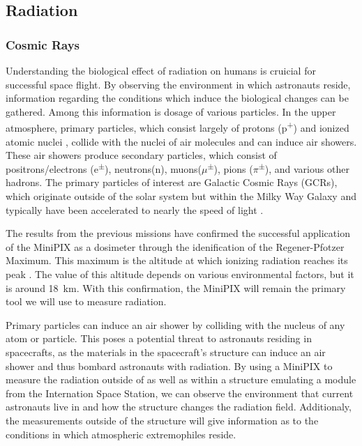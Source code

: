 \subsection{Radiation}
\label{subsec:RadiationBackground}


\subsubsection{Cosmic Rays}
Understanding the biological effect of radiation on humans is cruicial for successful space flight.
By observing the environment in which astronauts reside, information regarding the conditions which induce the biological changes can be gathered.
Among this information is dosage of various particles.
In the upper atmosphere, primary particles, which consist largely of protons (p\textsuperscript{+}) and ionized atomic nuclei \cite{Frank}, collide with the nuclei of air molecules and can induce air showers.
These air showers produce secondary particles, which consist of positrons/electrons (e\textsuperscript{$\pm$}), neutrons(n), muons($\mu$\textsuperscript{$\pm$}), pions ($\pi$\textsuperscript{$\pm$}), and various other hadrons.
The primary particles of interest are Galactic Cosmic Rays (GCRs), which originate outside of the solar system but within the Milky Way Galaxy and typically have been accelerated to nearly the speed of light \cite{GCRs}.

The results from the previous missions have confirmed the successful application of the MiniPIX as a dosimeter through the idenification of the Regener-Pfotzer Maximum. This maximum is the altitude at which ionizing radiation reaches its peak \cite{Regener}. The value of this altitude depends on various environmental factors, but it is around \SI{18}{\kilo\meter}. With this confirmation, the MiniPIX will remain the primary tool we will use to measure radiation.

Primary particles can induce an air shower by colliding with the nucleus of any atom or particle.
This poses a potential threat to astronauts residing in spacecrafts, as the materials in the spacecraft's structure can induce an air shower and thus bombard astronauts with radiation.
By using a MiniPIX to measure the radiation outside of as well as within a structure emulating a module from the Internation Space Station, we can observe the environment that current astronauts live in and how the structure changes the radiation field.
Additionaly, the measurements outside of the structure will give information as to the conditions in which atmospheric extremophiles reside.


